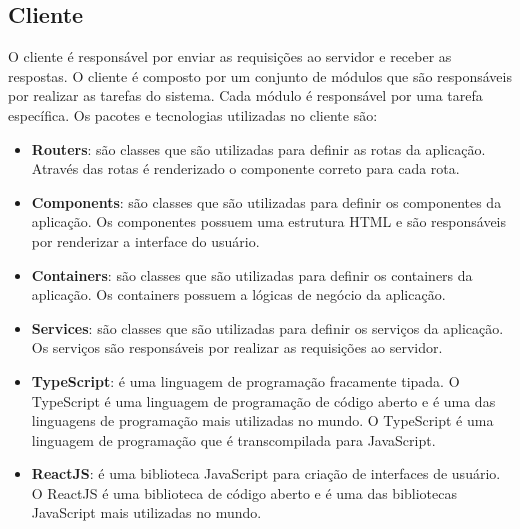 \subsection{Cliente}

O cliente é responsável por enviar as requisições ao servidor e receber as respostas. O cliente é composto por um conjunto de módulos que são responsáveis por realizar as tarefas do sistema. Cada módulo é responsável por uma tarefa específica. Os pacotes e tecnologias utilizadas no cliente são:

\begin{itemize}
    \item \textbf{Routers}: são classes que são utilizadas para definir as rotas da aplicação. Através das rotas é renderizado o componente correto para cada rota.
    \item \textbf{Components}: são classes que são utilizadas para definir os componentes da aplicação. Os componentes possuem uma estrutura HTML e são responsáveis por renderizar a interface do usuário.
    \item \textbf{Containers}: são classes que são utilizadas para definir os containers da aplicação. Os containers possuem a lógicas de negócio da aplicação.
    \item \textbf{Services}: são classes que são utilizadas para definir os serviços da aplicação. Os serviços são responsáveis por realizar as requisições ao servidor.
    \item \textbf{TypeScript}: é uma linguagem de programação fracamente tipada. O TypeScript é uma linguagem de programação de código aberto e é uma das linguagens de programação mais utilizadas no mundo. O TypeScript é uma linguagem de programação que é transcompilada para JavaScript.
    \item \textbf{ReactJS}: é uma biblioteca JavaScript para criação de interfaces de usuário. O ReactJS é uma biblioteca de código aberto e é uma das bibliotecas JavaScript mais utilizadas no mundo.
\end{itemize}


